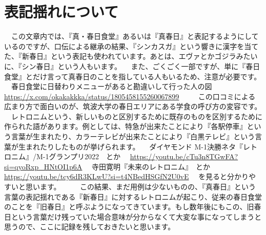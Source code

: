 \documentclass[
paper=a6,
fontsize=7pt,jafontsize=7pt,
baselineskip=1.6zh,
book,
hanging_punctuation,
head_space=10truemm,foot_space=10truemm
]{jlreq}
\begin{document}
\chapter{表記揺れについて}
　この文章内では、『真・春日食堂』あるいは『真春日』と表記するようにしているのですが、口伝による継承の結果、『シンカスガ』という響きに漢字を当てた、『新春日』という表記も使われています。あとは、エヴァとかゴジラみたいに、『シン春日』という人もいます。
　また、ごくごく一部ですが、単に『春日食堂』とだけ言って真春日のことを指している人もいるため、注意が必要です。
　春日食堂に日替わりメニューがあると勘違いして行った人の図
　\url{https://x.com/okakakkka/status/1805458155260067899}
　
　この口コミによる広まり方で面白いのが、筑波大学の春日エリアにある学食の呼び方の変容です。
　レトロニムという、新しいものと区別するために既存のものを区別するために作られた語があります。例としては、特急が出来たことにより『各駅停車』という言葉が生まれたり、カラーテレビが出来たことにより『白黒テレビ』という言葉が生まれたりしたものが挙げられます。
　ダイヤモンド M-1決勝ネタ『レトロニム』/M-1グランプリ2022　とか
　\url{https://youtu.be/cTu3n8TGwFA?si=qyoRxp_HNtOI1p6A}
　寺田寛明『未来のレトロニム』　とか
　\url{https://youtu.be/tcy6dR3KLwU?si=t4NBedHSGfN2U0vE}
　を見ると分かりやすいと思います。
　
　この結果、まだ用例は少ないものの、『真春日』という言葉の表記揺れである『新春日』に対するレトロニムが起こり、従来の春日食堂のことを『旧春日』と呼ぶようになってきています。もし数年後にもこの、旧春日という言葉だけ残っていた場合意味が分からなくて大変な事になってしまうと思うので、ここに記録を残しておきたいと思います。
　
\end{document}
